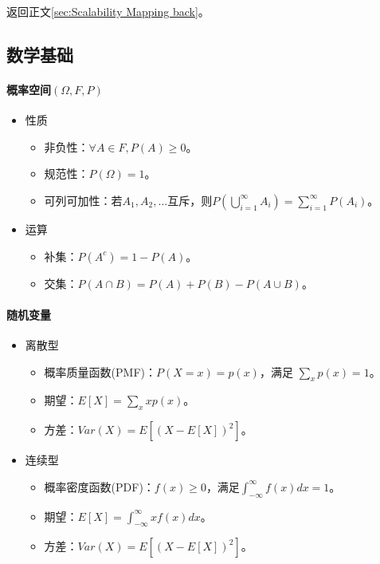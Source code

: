 \documentclass[
12pt, %
a4paper, 
oneside, %
headinclude,footinclude, %
]{scrartcl}
\begin{document}
返回正文\ref{sec:Scalability Mapping back}。
\subsection{数学基础}
\paragraph*{概率空间$ (\Omega, F, P) $}
\begin{itemize}
\item 性质
\begin{itemize}
\item 非负性：$ \forall A \in F,P(A) \geq 0 $。
\item 规范性：$ P(\Omega) = 1 $。
\item 可列可加性：若$ A_1, A_2, \dots $互斥，则$ P(\bigcup_{i = 1}^{\infty} A_i) = \sum_{i = 1}^{\infty} P(A_i) $。
\end{itemize}
\item 运算
\begin{itemize}
\item 补集：$ P(A^c) = 1 - P(A) $。
\item 交集：$ P(A \cap B) = P(A) + P(B) - P(A \cup B) $。
\end{itemize}
\end{itemize}
\paragraph*{随机变量}
\begin{itemize}
\item 离散型
\begin{itemize}
\item 概率质量函数(PMF)：$ P(X = x) = p(x) $，满足 $ \sum_{x} p(x) = 1 $。
\item 期望：$ E[X] = \sum_{x} x p(x) $。
\item 方差：$ Var(X) = E[(X - E[X])^2] $。
\end{itemize}
\item 连续型
\begin{itemize}
\item 概率密度函数(PDF)：$ f(x) \geq 0 $，满足$ \int_{-\infty}^{\infty} f(x) dx = 1 $。
\item 期望：$ E[X] = \int_{-\infty}^{\infty} x f(x) dx $。
\item 方差：$ Var(X) = E[(X - E[X])^2] $。
\end{itemize}
\end{itemize}
\end{document}
